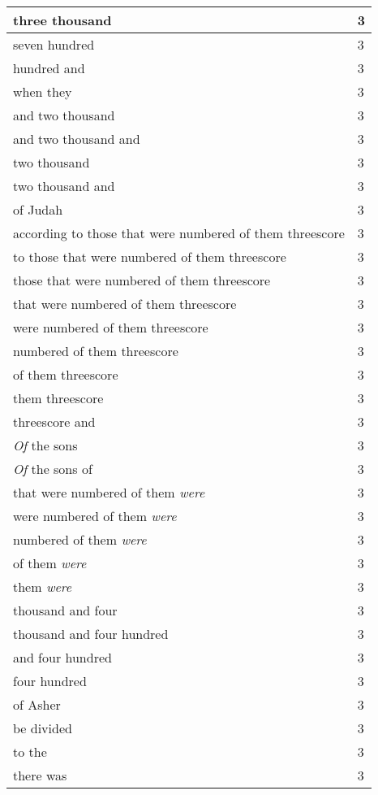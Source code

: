 \begin{center}
\begin{longtable}{|p{3.0in}|p{0.5in}|}
three thousand & 3\\ \hline 
seven hundred & 3\\ \hline 
hundred and & 3\\ \hline 
when they & 3\\ \hline 
and two thousand & 3\\ \hline 
and two thousand and & 3\\ \hline 
two thousand & 3\\ \hline 
two thousand and & 3\\ \hline 
of Judah & 3\\ \hline 
according to those that were numbered of them threescore & 3\\ \hline 
to those that were numbered of them threescore & 3\\ \hline 
those that were numbered of them threescore & 3\\ \hline 
that were numbered of them threescore & 3\\ \hline 
were numbered of them threescore & 3\\ \hline 
numbered of them threescore & 3\\ \hline 
of them threescore & 3\\ \hline 
them threescore & 3\\ \hline 
threescore and & 3\\ \hline 
\emph{Of} the sons & 3\\ \hline 
\emph{Of} the sons of & 3\\ \hline 
that were numbered of them \emph{were} & 3\\ \hline 
were numbered of them \emph{were} & 3\\ \hline 
numbered of them \emph{were} & 3\\ \hline 
of them \emph{were} & 3\\ \hline 
them \emph{were} & 3\\ \hline 
thousand and four & 3\\ \hline 
thousand and four hundred & 3\\ \hline 
and four hundred & 3\\ \hline 
four hundred & 3\\ \hline 
of Asher & 3\\ \hline 
be divided & 3\\ \hline 
to the & 3\\ \hline 
there was & 3\\ \hline 
\end{longtable}
\end{center}





